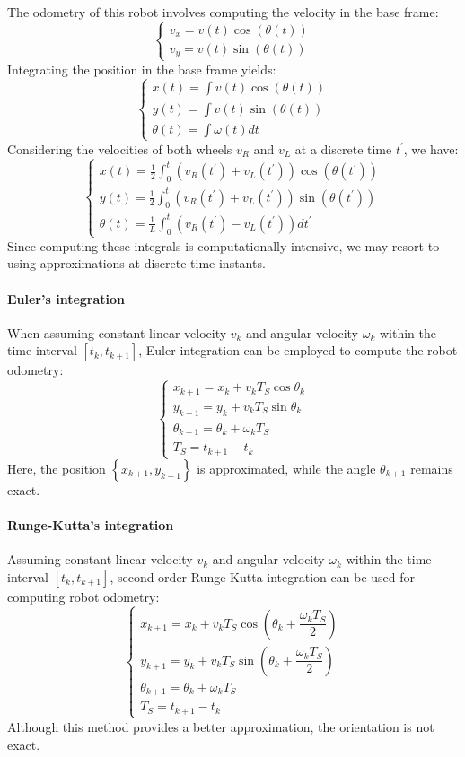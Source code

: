 The odometry of this robot involves computing the velocity in the base frame:
\[\begin{cases}
    v_x=v(t)\cos\left(\theta(t) \right) \\ 
    v_y=v(t)\sin\left(\theta(t) \right)
\end{cases}\]
Integrating the position in the base frame yields:
\[\begin{cases}
    x(t)=\int v(t)\cos\left(\theta(t) \right) \\
    y(t)=\int v(t)\sin\left(\theta(t) \right) \\
    \theta(t)=\int \omega(t) dt
\end{cases}\]
Considering the velocities of both wheels $v_R$ and $v_L$ at a discrete time $t^\prime$, we have:
\[\begin{cases}
    x(t)=\frac{1}{2} \int_0^t \left( v_R(t^\prime) + v_L(t^\prime) \right)\cos\left(\theta(t^\prime) \right) \\
    y(t)=\frac{1}{2} \int_0^t \left( v_R(t^\prime) + v_L(t^\prime) \right)\sin\left(\theta(t^\prime) \right) \\
    \theta(t)=\frac{1}{L} \int_0^t \left( v_R(t^\prime) - v_L(t^\prime) \right) dt^\prime
\end{cases}\]
Since computing these integrals is computationally intensive, we may resort to using approximations at discrete time instants.

\paragraph*{Euler's integration}
When assuming constant linear velocity $v_k$ and angular velocity $\omega_k$ within the time interval $\left[ t_k,t_{k+1} \right]$, Euler integration can be employed to compute the robot odometry:
\[\begin{cases}
    x_{k+1} = x_k + v_kT_S\cos\theta_k \\
    y_{k+1} = y_k + v_kT_S\sin\theta_k \\
    \theta_{k+1} = \theta_k + \omega_kT_S \\
    T_S=t_{k+1}-t_k
\end{cases}\]
Here, the position $\left\{x_{k+1}, y_{k+1}\right\}$ is approximated, while the angle $\theta_{k+1}$ remains exact.

\paragraph*{Runge-Kutta's integration}
Assuming constant linear velocity $v_k$ and angular velocity $\omega_k$ within the time interval $\left[ t_k,t_{k+1} \right]$, second-order Runge-Kutta integration can be used for computing robot odometry:
\[\begin{cases}
    x_{k+1} = x_k + v_kT_S\cos \left(\theta_k + \dfrac{\omega_kT_S}{2} \right)\\
    y_{k+1} = y_k + v_kT_S\sin\left(\theta_k + \dfrac{\omega_kT_S}{2} \right) \\
    \theta_{k+1} = \theta_k + \omega_kT_S \\
    T_S=t_{k+1}-t_k
\end{cases}\]
Although this method provides a better approximation, the orientation is not exact.

